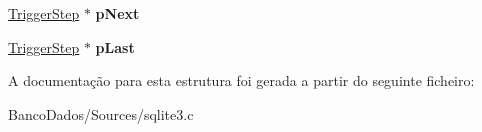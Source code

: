 \begin{DoxyCompactItemize}
\item 
\hypertarget{struct_trigger_step_a0757a0d22dbe2f7f57706014dd35759b}{\hyperlink{struct_trigger_step}{Trigger\-Step} $\ast$ {\bfseries p\-Next}}\label{struct_trigger_step_a0757a0d22dbe2f7f57706014dd35759b}

\item 
\hypertarget{struct_trigger_step_a0aae9ea7f436881c0e9e614476a69584}{\hyperlink{struct_trigger_step}{Trigger\-Step} $\ast$ {\bfseries p\-Last}}\label{struct_trigger_step_a0aae9ea7f436881c0e9e614476a69584}

\end{DoxyCompactItemize}


A documentação para esta estrutura foi gerada a partir do seguinte ficheiro\-:\begin{DoxyCompactItemize}
\item 
Banco\-Dados/\-Sources/sqlite3.\-c\end{DoxyCompactItemize}
